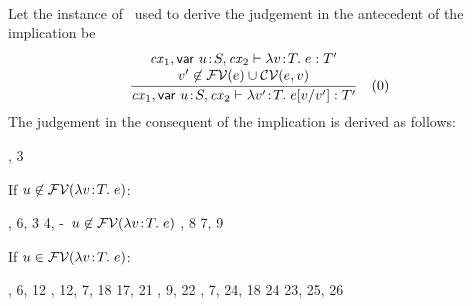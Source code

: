 \begin{bycase}
\Case{\Reabsalpha}\\
Let the instance of \Reabsalpha\ used to derive the judgement in the
antecedent of the implication be
\[
\rruleII
 {\hasty{\cxv}{\absO}{\typ'}}
 {\var'\not\in\efvar{\expr}\cup\cvarv{\expr}{\var}}
 {\hasty{\cxv}{\abs{\var'}{\typ}{\esbs{\expr}{\var}{\var'}}}{\typ'}}
 {0}
\]
The judgement in the consequent of the implication is derived as follows:
\begin{derivation}
     {, 3}
\end{derivation}
If $u\not\in\mathcal{FV}(\lambda v\!:\!T.\;e)$:
\begin{derivatioN}{4}
     {\Reabsalpha, 6, 3}
     {4, \hyp\ $u\not\in\mathcal{FV}(\lambda v\!:\!T.\;e)$}
     {, 8}
     {7, 9}
\end{derivatioN}
If $u\in\mathcal{FV}(\lambda v\!:\!T.\;e)$:
\begin{derivatioN}{4}
\steP{\varI\in\efvar{\expr}-\setI{\var}}
     {, 6, 12}
\step{\cvarv{\expr}{\var}=\cvarv{\esbsren{\expr}}{\var}}
     {, 12, 7, 18}
     {17, 21}
     {\Reabsalpha, 9, 22}
     {, 7, 24, 18}
     {24}
     {23, 25, 26}
\end{derivatioN}


\end{bycase}
